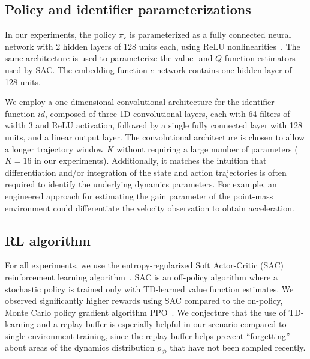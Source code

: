 \documentclass{article}
\newcommand{\embedfn}{e}
\newcommand{\idfn}{id}
\newcommand{\idset}{\mathcal{D}}
\newcommand{\idpdf}{p_{\idset}}
\newcommand{\latvar}{\varepsilon}
\begin{document}
\subsection{Policy and identifier parameterizations}
In our experiments,
the policy $\pi_\latvar$ is parameterized as a fully connected neural network
with 2 hidden layers of 128 units each, using ReLU nonlinearities~\cite{nair-ReLU}.
The same architecture is used to parameterize the value- and $Q$-function estimators used by SAC.
The embedding function $\embedfn$ network contains one hidden layer of 128 units.

We employ a one-dimensional convolutional architecture for the identifier function $\idfn$,
composed of three 1D-convolutional layers, each with 64 filters of width 3 and ReLU activation,
followed by a single fully connected layer with 128 units, and a linear output layer.
The convolutional architecture is chosen to allow a longer trajectory window $K$ without requiring a large number of parameters
($K = 16$ in our experiments).
Additionally, it matches the intuition that differentiation and/or integration of the state and action trajectories
is often required to identify the underlying dynamics parameters.
For example, an engineered approach for estimating the gain parameter of the point-mass environment could differentiate the velocity observation to obtain acceleration.

\subsection{RL algorithm}
For all experiments, we use the entropy-regularized Soft Actor-Critic (SAC) reinforcement learning algorithm~\citep{haarnoja-soft-actor-critic}.
SAC is an off-policy algorithm where a stochastic policy is trained only with TD-learned value function estimates.
We observed significantly higher rewards using SAC compared to the on-policy, Monte Carlo policy gradient algorithm PPO~\cite{schulman-ppo}.
We conjecture that the use of TD-learning and a replay buffer is especially helpful in our scenario compared to single-environment training,
since the replay buffer helps prevent ``forgetting'' about areas of the dynamics distribution $\idpdf$ that have not been sampled recently.
\end{document}
